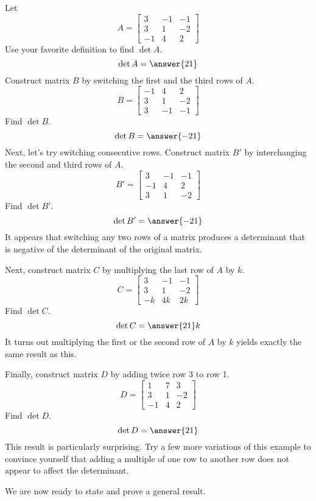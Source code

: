 \documentclass{ximera}
\begin{document}
\begin{initprob}\label{init:rowswap}
Let $$A=\begin{bmatrix}3&-1&-1\\3&1&-2\\-1&4&2\end{bmatrix}$$
Use your favorite definition to find $\det{A}$.
$$\det{A}=\answer{21}$$
Construct matrix $B$ by switching the first and the third rows of $A$.
$$B=\begin{bmatrix}-1&4&2\\3&1&-2\\3&-1&-1\end{bmatrix}$$
Find $\det{B}$.
$$\det{B}=\answer{-21}$$
Next, let's try switching consecutive rows.  Construct matrix $B'$ by interchanging the second and third rows of $A$.
$$B'=\begin{bmatrix}3&-1&-1\\-1&4&2\\3&1&-2\end{bmatrix}$$
Find $\det{B'}$.
$$\det{B'}=\answer{-21}$$
It appears that switching any two rows of a matrix produces a determinant that is negative of the determinant of the original matrix.

Next, construct matrix $C$ by multiplying the last row of $A$ by $k$.
$$C=\begin{bmatrix}3&-1&-1\\3&1&-2\\-k&4k&2k\end{bmatrix}$$
Find $\det{C}$.
$$\det{C}=\answer{21}k$$
It turns out multiplying the first or the second row of $A$ by $k$ yields exactly  the same result as this.

Finally, construct matrix $D$ by  adding twice row 3 to row 1.
$$D=\begin{bmatrix}1&7&3\\3&1&-2\\-1&4&2\end{bmatrix}$$
Find $\det{D}$.
$$\det{D}=\answer{21}$$
This result is particularly surprising.  Try a few more variations of this example to convince yourself that adding a multiple of one row to another row does not appear to affect the determinant.
\end{initprob}

We are now ready to state and prove a general result.
\end{document}
